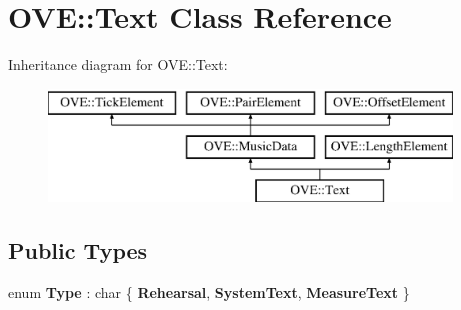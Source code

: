 \hypertarget{class_o_v_e_1_1_text}{}\section{O\+VE\+:\+:Text Class Reference}
\label{class_o_v_e_1_1_text}
Inheritance diagram for O\+VE\+:\+:Text\+:\begin{figure}[H]
\begin{center}
\leavevmode
\includegraphics[height=3.000000cm]{class_o_v_e_1_1_text}
\end{center}
\end{figure}
\subsection*{Public Types}
\begin{DoxyCompactItemize}
\item 
\mbox{\label{class_o_v_e_1_1_text_aadb2b5bf0a824a55aa67c1d160b16f01}} 
enum {\bfseries Type} \+: char \{ {\bfseries Rehearsal}, 
{\bfseries System\+Text}, 
{\bfseries Measure\+Text}
 \}
\end{DoxyCompactItemize}
